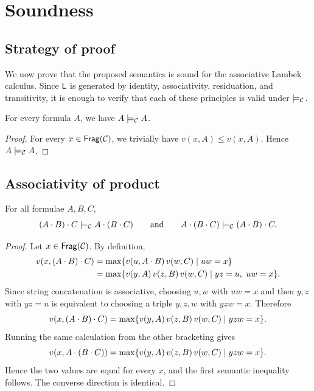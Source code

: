 \chapter{Soundness}

\section{Strategy of proof}
We now prove that the proposed semantics is sound for the associative Lambek calculus. Since
$\mathsf{L}$ is generated by identity, associativity, residuation, and transitivity, it is enough to verify
that each of these principles is valid under $\models_{\mathcal C}$.

\begin{theorem}[Identity]
For every formula $A$, we have $A \models_{\mathcal C} A$.
\end{theorem}

\begin{proof}
For every $x \in \mathsf{Frag}(\mathcal C)$, we trivially have $v(x,A) \leq v(x,A)$. Hence $A \models_{\mathcal C} A$.
\end{proof}


\section{Associativity of product}
\begin{theorem}[Associativity]
For all formulae $A,B,C$,
\[
(A\mathbin{\cdot} B)\mathbin{\cdot} C \models_{\mathcal C} A\mathbin{\cdot}(B\mathbin{\cdot} C)
\qquad\text{and}\qquad
A\mathbin{\cdot}(B\mathbin{\cdot} C) \models_{\mathcal C} (A\mathbin{\cdot} B)\mathbin{\cdot} C.
\]
\end{theorem}

\begin{proof}
Let $x \in \mathsf{Frag}(\mathcal C)$. By definition,
\begin{align*}
v(x,(A\mathbin{\cdot} B)\mathbin{\cdot} C)
&= \max\{v(u,A\mathbin{\cdot} B)\,v(w,C) \mid uw=x\} \\
&= \max\{v(y,A)\,v(z,B)\,v(w,C) \mid yz=u,\ uw=x\}.
\end{align*}
Since string concatenation is associative, choosing $u,w$ with $uw=x$ and then $y,z$ with
$yz=u$ is equivalent to choosing a triple $y,z,w$ with $yzw=x$. Therefore
\[
v(x,(A\mathbin{\cdot} B)\mathbin{\cdot} C)
= \max\{v(y,A)\,v(z,B)\,v(w,C) \mid yzw=x\}.
\]
Running the same calculation from the other bracketing gives
\[
v(x,A\mathbin{\cdot}(B\mathbin{\cdot} C))
= \max\{v(y,A)\,v(z,B)\,v(w,C) \mid yzw=x\}.
\]
Hence the two values are equal for every $x$, and the first semantic inequality follows.
The converse direction is identical.
\end{proof}


